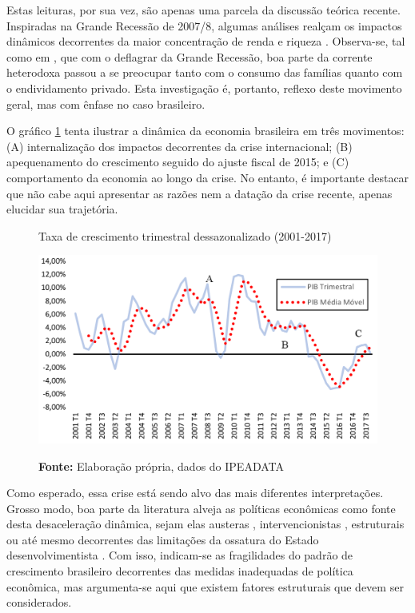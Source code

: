 Estas leituras, por sua vez, são apenas uma parcela da discussão teórica recente. Inspiradas na Grande Recessão de 2007/8, algumas análises realçam os impactos dinâmicos decorrentes da maior concentração de renda e riqueza \cites{barba_rising_2009}{stockhammer_rising_2015}. Observa-se, tal como em \textcite{brochier_macroeconomics_2017}, que com o deflagrar da Grande Recessão, boa parte da corrente heterodoxa passou a se preocupar tanto com o consumo das famílias quanto com o endividamento privado. Esta investigação é, portanto, reflexo deste movimento geral, mas com ênfase no caso brasileiro.

 O gráfico \ref{PIB} tenta ilustrar a dinâmica da economia brasileira em três movimentos: (A) internalização dos impactos decorrentes da crise internacional; (B) apequenamento do crescimento seguido do ajuste fiscal de 2015; e (C) comportamento da economia ao longo da crise. No entanto, é importante destacar que não cabe aqui apresentar as razões nem a datação da crise recente, apenas elucidar sua trajetória.

\begin{figure}[htb]
\begin{center}
		\caption{Taxa de crescimento trimestral dessazonalizado (2001-2017) }
\label{PIB}
\includegraphics[width=\textwidth]{PIB_FAPESP}
\end{center}
\caption*{\textbf{Fonte:} Elaboração própria, dados do IPEADATA}
\end{figure}

Como esperado, essa crise está sendo alvo das mais diferentes 
interpretações.
Grosso modo, boa parte da literatura alveja as políticas econômicas como fonte desta desaceleração dinâmica, sejam elas austeras \cite{serrano_demanda_2015}, intervencionistas \cite{barbosa_filho_crise_2017}, estruturais \cite{bacha_saida_2017} ou até mesmo decorrentes das limitações da ossatura do Estado desenvolvimentista \cite{carneiro_economia_2017}. Com isso, indicam-se as fragilidades do padrão de crescimento brasileiro decorrentes das medidas inadequadas de política econômica, mas argumenta-se aqui que existem fatores estruturais que devem ser considerados.

